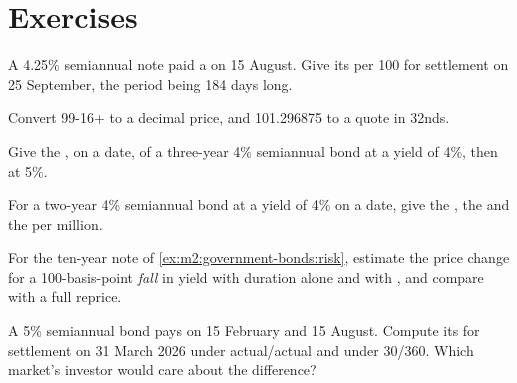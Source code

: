 \section{Exercises}

\begin{exercise}[$\star$]\label{exo:m2:government-bonds:1}
A 4.25\% semiannual note paid a  on 15 August. Give its 
per 100 for settlement on 25 September, the period being 184 days long.
\end{exercise}

\begin{exercise}[$\star$]\label{exo:m2:government-bonds:2}
Convert 99-16+ to a decimal price, and 101.296875 to a quote in 32nds.
\end{exercise}

\begin{exercise}[$\star$]\label{exo:m2:government-bonds:3}
Give the , on a  date, of a three-year 4\% semiannual bond
at a yield of 4\%, then at 5\%.
\end{exercise}

\begin{exercise}[$\star\star$]\label{exo:m2:government-bonds:4}
For a two-year 4\% semiannual bond at a yield of 4\% on a  date, give
the , the  and the  per million.
\end{exercise}

\begin{exercise}[$\star\star$]\label{exo:m2:government-bonds:5}
For the ten-year note of \cref{ex:m2:government-bonds:risk}, estimate the
price change for a 100-basis-point \emph{fall} in yield with duration alone
and with , and compare with a full reprice.
\end{exercise}

\begin{exercise}[$\star\star$]\label{exo:m2:government-bonds:6}
A 5\% semiannual bond pays on 15 February and 15 August. Compute its  for settlement on 31 March 2026 under actual/actual and under 30/360.
Which market's investor would care about the difference?
\end{exercise}

